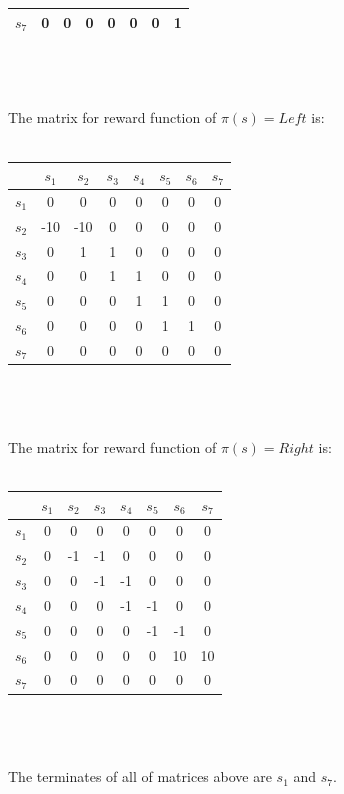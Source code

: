 \documentclass[12pt]{article}
\begin{document}
\begin{enumerate}
\begin{tabular}{|c|c|c|c|c|c|c|c|}
\hline 
$s_7$ & 0 & 0 & 0 & 0 & 0 & 0 & 1 \\ 
\hline 
\end{tabular}\\\\\\
The matrix for reward function of $\pi(s) = Left$ is:\\\\
\begin{tabular}{|c|c|c|c|c|c|c|c|}
\hline 
 & $s_1$ & $s_2$ & $s_3$ & $s_4$ & $s_5$ & $s_6$ & $s_7$ \\ 
\hline 
$s_1$ & 0 & 0 & 0 & 0 & 0 & 0 & 0 \\ 
\hline 
$s_2$ & -10 & -10 & 0 & 0 & 0 & 0 & 0 \\ 
\hline 
$s_3$ & 0 & 1 & 1 & 0 & 0 & 0 & 0 \\ 
\hline 
$s_4$ & 0 & 0 & 1 & 1 & 0 & 0 & 0 \\ 
\hline 
$s_5$ & 0 & 0 & 0 & 1 & 1 & 0 & 0 \\ 
\hline 
$s_6$ & 0 & 0 & 0 & 0 & 1 & 1 & 0 \\ 
\hline 
$s_7$ & 0 & 0 & 0 & 0 & 0 & 0 & 0 \\ 
\hline 
\end{tabular}\\\\\\
The matrix for reward function of $\pi(s) = Right$ is:\\\\
\begin{tabular}{|c|c|c|c|c|c|c|c|}
\hline
 & $s_1$ & $s_2$ & $s_3$ & $s_4$ & $s_5$ & $s_6$ & $s_7$ \\ 
\hline 
$s_1$ & 0 & 0 & 0 & 0 & 0 & 0 & 0 \\ 
\hline 
$s_2$ & 0 & -1 & -1 & 0 & 0 & 0 & 0 \\ 
\hline 
$s_3$ & 0 & 0 & -1 & -1 & 0 & 0 & 0 \\ 
\hline 
$s_4$ & 0 & 0 & 0 & -1 & -1 & 0 & 0 \\ 
\hline 
$s_5$ & 0 & 0 & 0 & 0 & -1 & -1 & 0 \\ 
\hline 
$s_6$ & 0 & 0 & 0 & 0 & 0 & 10 & 10 \\ 
\hline 
$s_7$ & 0 & 0 & 0 & 0 & 0 & 0 & 0 \\ 
\hline 
\end{tabular}\\\\\\
The terminates of all of matrices above are $s_1$ and $s_7$.\\\\

\end{enumerate}
\end{document}
